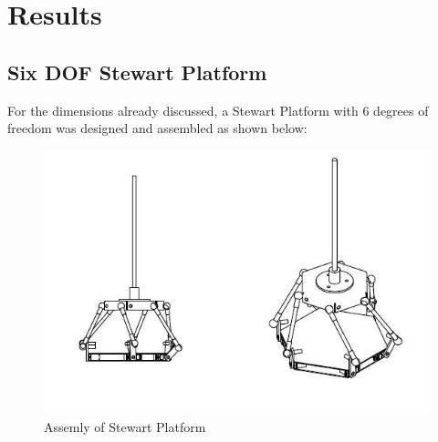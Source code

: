 \chapter{Results}
\section{Six DOF Stewart Platform}
For the dimensions already discussed, a Stewart Platform with 6 degrees of freedom was designed and assembled as shown below:
\begin{center}
	\begin{figure}[!h]
	\centering
	\includegraphics[width=0.8\linewidth]{Figures/Assembly}
	\caption[Assembled Platform]{Assemly of Stewart Platform}
	\end{figure}
\end{center}


\newpage
